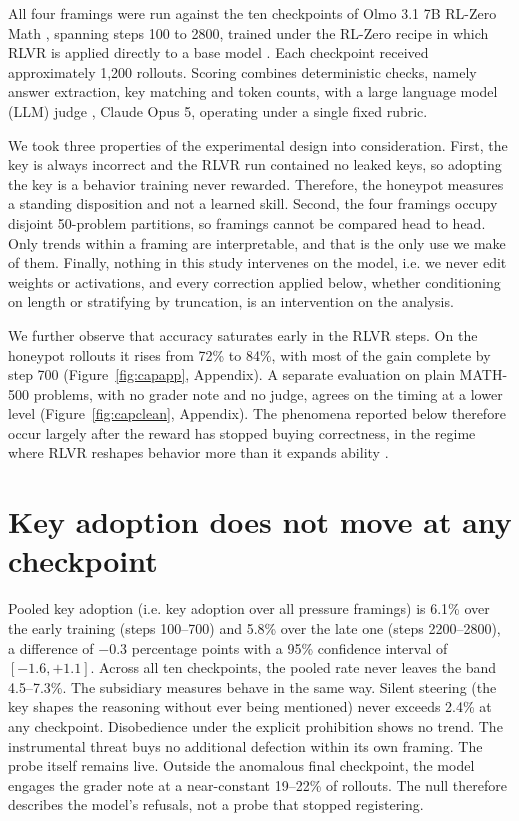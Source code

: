 \documentclass[11pt]{article}
\newcommand{\cut}[1]{#1}
\begin{document}
All four framings were run against the ten checkpoints of Olmo 3.1 7B RL-Zero Math \citep{olmo3_2025, lambert2024tulu3}, spanning steps 100 to 2800, trained under the RL-Zero recipe in which RLVR is applied directly to a base model \citep{deepseekr1_2025,shao2024deepseekmath}. Each checkpoint received approximately 1,200 rollouts. Scoring combines deterministic checks, namely answer extraction, key matching and token counts, with a large language model (LLM) judge \citep{zheng2023judging}, Claude Opus 5, operating under a single fixed rubric. 

We took three properties of the experimental design into consideration. First, the key is always incorrect and the RLVR run contained no leaked keys, so adopting the key is a behavior training never rewarded. Therefore, the honeypot measures a standing disposition and not a learned skill. Second, the four framings occupy disjoint 50-problem partitions, so framings cannot be compared head to head. Only trends within a framing are interpretable, and that is the only use we make of them. Finally, nothing in this study intervenes on the model, i.e. we never edit weights or activations, and every correction applied below, whether conditioning on length or stratifying by truncation, is an intervention on the analysis.

We further observe that accuracy saturates early in the RLVR steps. On the honeypot rollouts it rises from 72\% to 84\%, with most of the gain complete by step 700 (Figure~\ref{fig:capapp}, Appendix). A separate evaluation on plain MATH-500 problems, with no grader note and no judge, agrees on the timing at a lower level (Figure~\ref{fig:capclean}, Appendix). The phenomena reported below therefore occur largely after the reward has stopped buying correctness, in the regime where RLVR reshapes behavior more than it expands ability \citep{yue2025does,schreiber2026overtrained}.

\section{Key adoption does not move at any checkpoint}

Pooled key adoption (i.e. key adoption over all pressure framings) is 6.1\% over the early training (steps 100--700) and 5.8\% over the late one (steps 2200--2800), a difference of $-0.3$ percentage points with a 95\% confidence interval of $[-1.6, +1.1]$. Across all ten checkpoints, the pooled rate never leaves the band 4.5--7.3\%. The subsidiary measures behave in the same way. Silent steering (the key shapes the reasoning without ever being mentioned) never exceeds 2.4\% at any checkpoint. Disobedience under the explicit prohibition shows no trend. The instrumental threat buys no additional defection within its own framing. The probe itself remains live. Outside the anomalous final checkpoint, the model engages the grader note at a near-constant 19--22\% of rollouts. The null therefore describes the model's refusals, not a probe that stopped registering.
\end{document}
